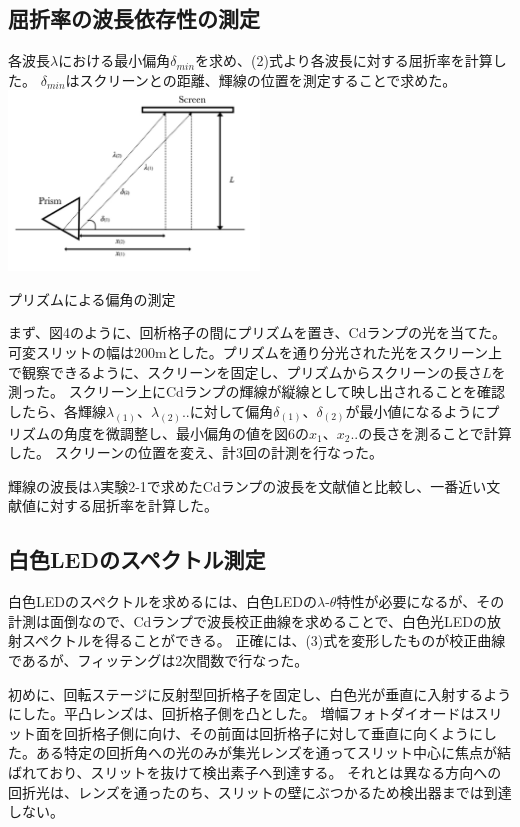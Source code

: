 \documentclass[a4paper,10pt]{jsarticle}
\makeatletter
\newenvironment{figurehere}
{\def\@captype{figure}}
{}
\makeatother
\begin{document}
\begin{multicols}{2}
\subsection{屈折率の波長依存性の測定}
各波長$\lambda$における最小偏角$\delta_{min}$を求め、(2)式より各波長に対する屈折率を計算した。
$\delta_{min}$はスクリーンとの距離、輝線の位置を測定することで求めた。
\\

\begin{figurehere}
  \centering
  \includegraphics[width=0.5\textwidth]{figs/prism.pdf}
  \caption{プリズムによる偏角の測定}
  \label{fig:fig1}
\end{figurehere}
まず、図4のように、回析格子の間にプリズムを置き、Cdランプの光を当てた。
可変スリットの幅は200\textmu mとした。プリズムを通り分光された光をスクリーン上で観察できるように、スクリーンを固定し、プリズムからスクリーンの長さ$L$を測った。
スクリーン上にCdランプの輝線が縦線として映し出されることを確認したら、各輝線$\lambda_{(1)}$、$\lambda_{(2)}$..に対して偏角$\delta_{(1)}$、$\delta_{(2)}$が最小値になるようにプリズムの角度を微調整し、最小偏角の値を図6の$x_1$、$x_2$..の長さを測ることで計算した。
スクリーンの位置を変え、計3回の計測を行なった。

輝線の波長は$\lambda$実験2-1で求めたCdランプの波長を文献値と比較し、一番近い文献値に対する屈折率を計算した。

\subsection{白色LEDのスペクトル測定}

白色LEDのスペクトルを求めるには、白色LEDの$\lambda$-$\theta$特性が必要になるが、その計測は面倒なので、Cdランプで波長校正曲線を求めることで、白色光LEDの放射スペクトルを得ることができる。
正確には、(3)式を変形したものが校正曲線であるが、フィッテングは2次間数で行なった。

初めに、回転ステージに反射型回折格子を固定し、白色光が垂直に入射するようにした。平凸レンズは、回折格子側を凸とした。
増幅フォトダイオードはスリット面を回折格子側に向け、その前面は回折格子に対して垂直に向くようにした。ある特定の回折角への光のみが集光レンズを通ってスリット中心に焦点が結ばれており、スリットを抜けて検出素子へ到達する。
それとは異なる方向への回折光は、レンズを通ったのち、スリットの壁にぶつかるため検出器までは到達しない。


\end{multicols}
\end{document}
